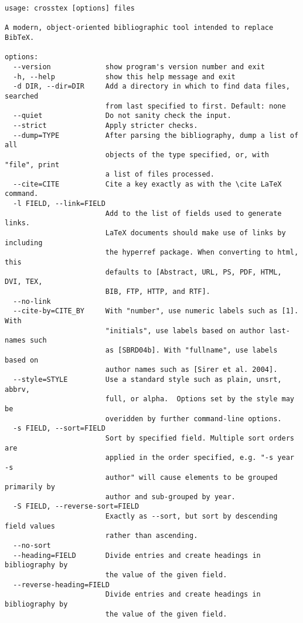 \documentclass{article}
\begin{document}
\begin{small}\begin{verbatim}
usage: crosstex [options] files

A modern, object-oriented bibliographic tool intended to replace BibTeX.

options:
  --version             show program's version number and exit
  -h, --help            show this help message and exit
  -d DIR, --dir=DIR     Add a directory in which to find data files, searched
                        from last specified to first. Default: none
  --quiet               Do not sanity check the input.
  --strict              Apply stricter checks.
  --dump=TYPE           After parsing the bibliography, dump a list of all
                        objects of the type specified, or, with "file", print
                        a list of files processed.
  --cite=CITE           Cite a key exactly as with the \cite LaTeX command.
  -l FIELD, --link=FIELD
                        Add to the list of fields used to generate links.
                        LaTeX documents should make use of links by including
                        the hyperref package. When converting to html, this
                        defaults to [Abstract, URL, PS, PDF, HTML, DVI, TEX,
                        BIB, FTP, HTTP, and RTF].
  --no-link             
  --cite-by=CITE_BY     With "number", use numeric labels such as [1]. With
                        "initials", use labels based on author last-names such
                        as [SBRD04b]. With "fullname", use labels based on
                        author names such as [Sirer et al. 2004].
  --style=STYLE         Use a standard style such as plain, unsrt, abbrv,
                        full, or alpha.  Options set by the style may be
                        overidden by further command-line options.
  -s FIELD, --sort=FIELD
                        Sort by specified field. Multiple sort orders are
                        applied in the order specified, e.g. "-s year -s
                        author" will cause elements to be grouped primarily by
                        author and sub-grouped by year.
  -S FIELD, --reverse-sort=FIELD
                        Exactly as --sort, but sort by descending field values
                        rather than ascending.
  --no-sort             
  --heading=FIELD       Divide entries and create headings in bibliography by
                        the value of the given field.
  --reverse-heading=FIELD
                        Divide entries and create headings in bibliography by
                        the value of the given field.

\end{verbatim}
\end{small}
\end{document}

